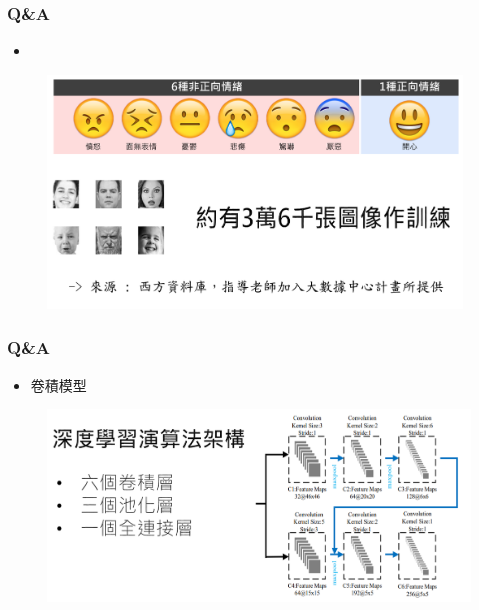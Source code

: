 \documentclass[10pt, conference, compsocconf]{beamer}
\begin{document}
\begin{CJK}{UTF8}{}
\begin{frame}
\frametitle{Q\&A}
\begin{itemize}
\item{}
\end{itemize}
\begin{figure}[t]
\begin{center}
\includegraphics[width=11cm]{./Figures/QAEmotion.pdf}
\end{center}
\end{figure}
\end{frame}

\begin{frame}
\frametitle{Q\&A}
\begin{itemize}
\item\Large 卷積模型
\end{itemize}
\begin{figure}[t]
\begin{center}
\includegraphics[width=12cm]{./Figures/3.png}
\end{center}
\end{figure}
\end{frame}


\end{CJK}
\end{document}
